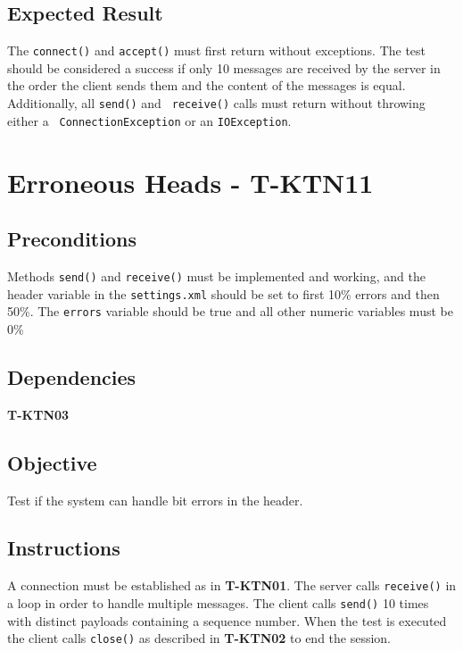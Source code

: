 \documentclass{article}
\begin{document}
\subsection{Expected Result}

The \texttt{connect()} and \texttt{accept()} must first return without
exceptions. The test should be considered a success if only 10 messages are
received by the server in the order the client sends them and the content of
the messages is equal. Additionally, all \texttt{send()} and \texttt{%
receive()} calls must return without throwing either a \texttt{%
ConnectionException} or an \texttt{IOException}.

\section{Erroneous Heads - T-KTN11}

\subsection{Preconditions}

Methods \texttt{send()} and \texttt{receive()} must be implemented and
working, and the header variable in the \texttt{settings.xml} should be set
to first 10\% errors and then 50\%. The \texttt{errors} variable should be
true and all other numeric variables must be 0\%

\subsection{Dependencies}

\textbf{T-KTN03}

\subsection{Objective}

Test if the system can handle bit errors in the header.

\subsection{Instructions}

A connection must be established as in \textbf{T-KTN01}. The server calls 
\texttt{receive()} in a loop in order to handle multiple messages. The
client calls \texttt{send()} 10 times with distinct payloads containing a
sequence number. When the test is executed the client calls \texttt{close()}
as described in \textbf{T-KTN02} to end the session.
\end{document}
